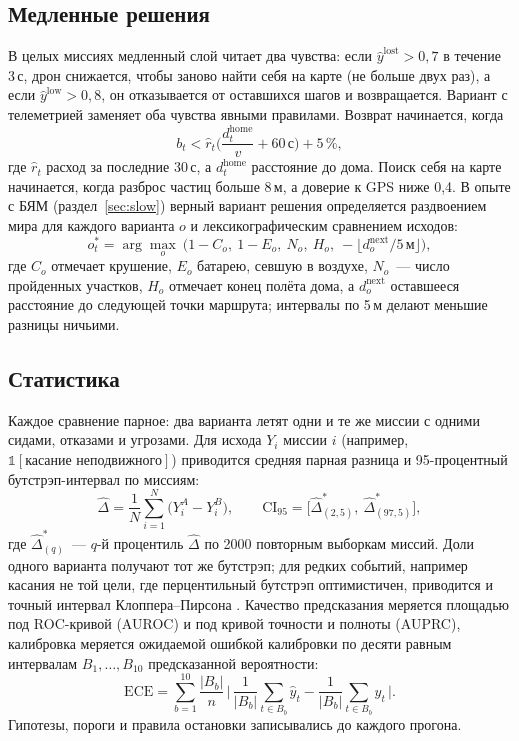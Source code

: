 \documentclass[10pt]{article}
\begin{document}
\subsection{Медленные решения}
В целых миссиях медленный слой читает два чувства: если $\hat y^{\mathrm{lost}}>0{,}7$ в течение 3\,с, дрон снижается, чтобы
заново найти себя на карте (не больше двух раз), а если $\hat y^{\mathrm{low}}>0{,}8$, он отказывается от оставшихся шагов и
возвращается. Вариант с телеметрией заменяет оба чувства явными правилами. Возврат начинается, когда
\begin{equation}
b_t<\hat r_t\Big(\frac{d^{\mathrm{home}}_t}{v}+60\,\text{с}\Big)+5\,\%,
\end{equation}
где $\hat r_t$ расход за последние 30\,с, а $d^{\mathrm{home}}_t$ расстояние до дома. Поиск себя на карте начинается, когда разброс
частиц больше 8\,м, а доверие к GPS ниже 0,4. В опыте с БЯМ (раздел~\ref{sec:slow}) верный вариант решения определяется
раздвоением мира для каждого варианта $o$ и лексикографическим сравнением исходов:
\begin{equation}
o^{*}_t=\arg\max_{o}\ \big(1-C_o,\ 1-E_o,\ N_o,\ H_o,\ -\lfloor d^{\mathrm{next}}_o/5\,\text{м}\rfloor\big),
\end{equation}
где $C_o$ отмечает крушение, $E_o$ батарею, севшую в воздухе, $N_o$~--- число пройденных участков, $H_o$ отмечает конец полёта дома,
а $d^{\mathrm{next}}_o$ оставшееся расстояние до следующей точки маршрута; интервалы по 5\,м делают меньшие разницы ничьими.

\subsection{Статистика}
Каждое сравнение парное: два варианта летят одни и те же миссии с одними сидами, отказами и угрозами. Для исхода $Y_i$ миссии
$i$ (например, $\mathbb{1}[\text{касание неподвижного}]$) приводится средняя парная разница и 95-процентный бутстрэп-интервал \citep{efron1993} по
миссиям:
\begin{equation}
\hat\Delta=\frac1N\sum_{i=1}^{N}\big(Y^{A}_i-Y^{B}_i\big),\qquad
\mathrm{CI}_{95}=\big[\hat\Delta^{*}_{(2{,}5)},\ \hat\Delta^{*}_{(97{,}5)}\big],
\end{equation}
где $\hat\Delta^{*}_{(q)}$~--- $q$-й процентиль $\hat\Delta$ по 2000 повторным выборкам миссий. Доли одного варианта получают тот
же бутстрэп; для редких событий, например касания не той цели, где перцентильный бутстрэп оптимистичен, приводится и
точный интервал Клоппера--Пирсона \citep{clopper1934}. Качество предсказания меряется площадью под ROC-кривой (AUROC) и под кривой точности и полноты (AUPRC), калибровка
меряется ожидаемой ошибкой калибровки \citep{naeini2015,guo2017} по десяти равным интервалам $B_1,\dots,B_{10}$ предсказанной вероятности:
\begin{equation}
\mathrm{ECE}=\sum_{b=1}^{10}\frac{|B_b|}{n}\,\Big|\,\frac{1}{|B_b|}\sum_{t\in B_b}\hat y_t-\frac{1}{|B_b|}\sum_{t\in B_b}y_t\,\Big|.
\end{equation}
Гипотезы, пороги и правила остановки записывались до каждого прогона.
\end{document}

